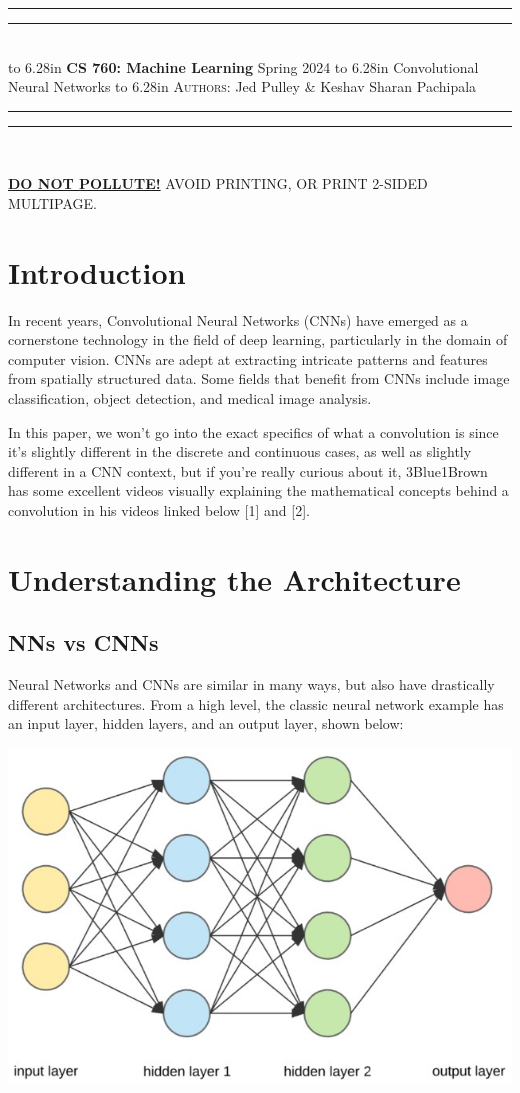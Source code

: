 \documentclass{article}
\newcommand{\lecture}[2]{
\pagestyle{myheadings}
\thispagestyle{plain}
\newpage
\noindent
\begin{center}
\rule{\textwidth}{1.6pt}\vspace*{-\baselineskip}\vspace*{2pt} %
\rule{\textwidth}{0.4pt}\\[1\baselineskip] %
\vbox{\vspace{2mm}
\hbox to 6.28in { {\bf CS 760: Machine Learning} \hfill Spring 2024 }
\vspace{4mm}
\hbox to 6.28in { {\Large \hfill #1  \hfill} }
\vspace{4mm}
\hbox to 6.28in { {\scshape Authors:}  #2 \hfill }}
\vspace{-2mm}
\rule{\textwidth}{0.4pt}\vspace*{-\baselineskip}\vspace{3.2pt} %
\rule{\textwidth}{1.6pt}\\[\baselineskip] %
\end{center}
\vspace*{4mm}
}
\begin{document}
\lecture{Convolutional Neural Networks}{Jed Pulley \& Keshav Sharan Pachipala}

\begin{center}
{\Large {\sf \underline{\textbf{DO NOT POLLUTE!}} AVOID PRINTING, OR PRINT 2-SIDED MULTIPAGE.}}
\end{center}


\section{Introduction}
    In recent years, Convolutional Neural Networks (CNNs) have emerged as a cornerstone technology in the field of deep learning, particularly in the domain of computer vision. CNNs are adept at extracting intricate patterns and features from spatially structured data. Some fields that benefit from CNNs include image classification, object detection, and medical image analysis.
    
    In this paper, we won't go into the exact specifics of what a convolution is since it's slightly different in the discrete and continuous cases, as well as slightly different in a CNN context, but if you're really curious about it, 3Blue1Brown has some excellent videos visually explaining the mathematical concepts behind a convolution in his videos linked below [1] and [2].

\section{Understanding the Architecture}
    \subsection{NNs vs CNNs}
        Neural Networks and CNNs are similar in many ways, but also have drastically different architectures. From a high level, the classic neural network example has an input layer, hidden layers, and an output layer, shown below:
        
        \begin{center}
            \includegraphics[scale=0.5]{images/NN.jpg}    
        \end{center}
        
\end{document}
